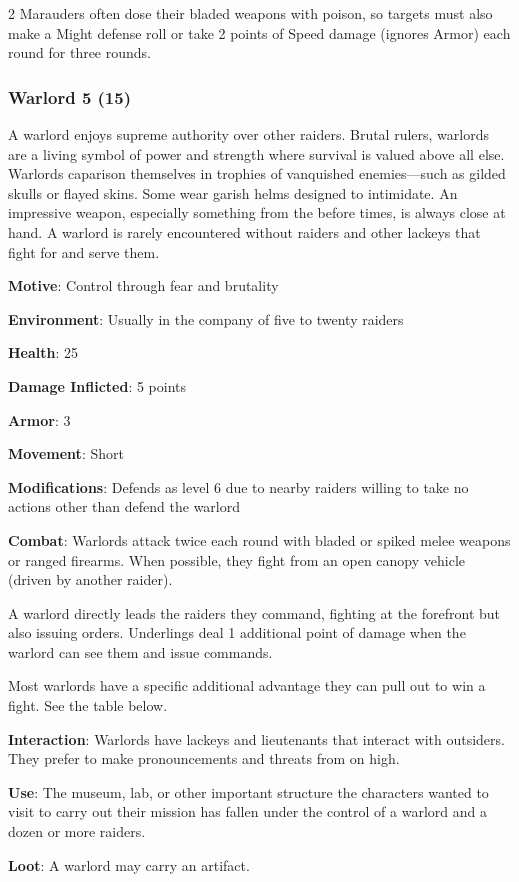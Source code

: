 \begin{multicols}{2}
Marauders often dose their bladed weapons with poison, so targets must also make a Might defense roll or take 2 points of Speed damage (ignores Armor) each round for three rounds.

\subsubsection{Warlord 5 (15)}

A warlord enjoys supreme authority over other raiders. Brutal rulers, warlords are a living symbol of power and strength where survival is valued above all else. 
Warlords caparison themselves in trophies of vanquished enemies—such as gilded skulls or flayed skins. Some wear garish helms designed to intimidate. An impressive weapon, especially something from the before times, is always close at hand. A warlord is rarely encountered without raiders and other lackeys that fight for and serve them.

\textbf{Motive}: Control through fear and brutality 

\textbf{Environment}: Usually in the company of five to twenty raiders 

\textbf{Health}: 25 

\textbf{Damage Inflicted}: 5 points 

\textbf{Armor}: 3 

\textbf{Movement}: Short 

\textbf{Modifications}: Defends as level 6 due to nearby raiders willing to take no actions other than defend the warlord 

\textbf{Combat}: Warlords attack twice each round with bladed or spiked melee weapons or ranged firearms. When possible, they fight from an open canopy vehicle (driven by another raider). 

A warlord directly leads the raiders they command, fighting at the forefront but also issuing orders. Underlings deal 1 additional point of damage when the warlord can see them and issue commands. 

Most warlords have a specific additional advantage they can pull out to win a fight. See the table below. 

\textbf{Interaction}: Warlords have lackeys and lieutenants that interact with outsiders. They prefer to make pronouncements and threats from on high. 

\textbf{Use}: The museum, lab, or other important structure the characters wanted to visit to carry out their mission has fallen under the control of a warlord and a dozen or more raiders. 

\textbf{Loot}: A warlord may carry an artifact.


\end{multicols}

